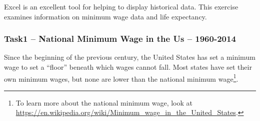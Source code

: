Excel is an excellent tool for helping to display historical data. This exercise examines information on minimum wage data and life expectancy.

\subsubsection{Task1 – National Minimum Wage in the Us – 1960-2014}

Since the beginning of the previous century, the United States has set a minimum wage to set a ``floor'' beneath which wages cannot fall. Most states have set their own minimum wages, but none are lower than the national minimum wage\footnote{To learn more about the national minimum wage, look at \url{https://en.wikipedia.org/wiki/Minimum_wage_in_the_United_States}.}.

